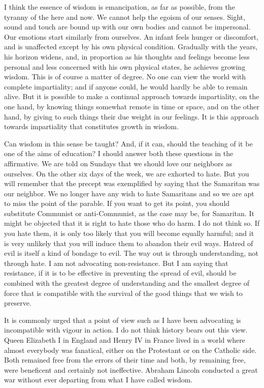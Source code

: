 I think the essence of wisdom is emancipation, as far
as possible, from the tyranny of the here and now. We
cannot help the egoism of our senses. Sight, sound
and touch are bound up with our own bodies and cannot
be impersonal. Our emotions start similarly from
ourselves. An infant feels hunger or discomfort, and
is unaffected except by his own physical condition.
Gradually with the years, his horizon widens, and, in
proportion as his thoughts and feelings become less
personal and less concerned with his own physical
states, he achieves growing wisdom. This is of course
a matter of degree. No one can view the world with
complete impartiality; and if anyone could, he would
hardly be able to remain alive. But it is possible to
make a continual approach towards impartiality, on the
one hand, by knowing things somewhat remote in time or
space, and on the other hand, by giving to such things
their due weight in our feelings. It is this approach
towards impartiality that constitutes growth in
wisdom.

Can wisdom in this sense be taught? And, if it can,
should the teaching of it be one of the aims of
education? I should answer both these questions in the
affirmative. We are told on Sundays that we should
love our neighbors as ourselves. On the other six days
of the week, we are exhorted to hate. But you will
remember that the precept was exemplified by saying
that the Samaritan was our neighbor. We no longer
have any wish to hate Samaritans and so we are apt to
miss the point of the parable. If you want to get its
point, you should substitute Communist or
anti-Communist, as the case may be, for Samaritan. It
might be objected that it is right to hate those who
do harm. I do not think so. If you hate them, it is
only too likely that you will become equally harmful;
and it is very unlikely that you will induce them to
abandon their evil ways. Hatred of evil is itself a
kind of bondage to evil. The way out is through
understanding, not through hate. I am not advocating
non-resistance. But I am saying that resistance, if it
is to be effective in preventing the spread of evil,
should be combined with the greatest degree of
understanding and the smallest degree of force that is
compatible with the survival of the good things that
we wish to preserve.

It is commonly urged that a point of view such as I
have been advocating is incompatible with vigour in
action. I do not think history bears out this view.
Queen Elizabeth I in England and Henry IV in France
lived in a world where almost everybody was fanatical,
either on the Protestant or on the Catholic side. Both
remained free from the errors of their time and both,
by remaining free, were beneficent and certainly not
ineffective. Abraham Lincoln conducted a great war
without ever departing from what I have called wisdom.

